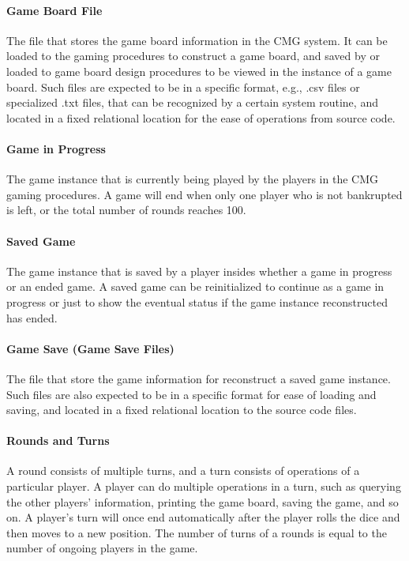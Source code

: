 \documentclass{article}
\begin{document}
\paragraph{Game Board File} The file that stores the game board information in the CMG system. It can be loaded to the gaming procedures to construct a game board, and saved by or loaded to game board design procedures to be viewed in the instance of a game board.
Such files are expected to be in a specific format, e.g., .csv files or specialized .txt files, that can be recognized by a certain system routine, and located in a fixed relational location
for the ease of operations from source code.

\paragraph{Game in Progress} The game instance that is currently being played by the players in the CMG gaming procedures. A game will end when only one player who is not bankrupted is left, or the total number of rounds reaches 100.

\paragraph{Saved Game} The game instance that is saved by a player insides whether a game in progress or an ended game. 
A saved game can be reinitialized to continue as a game in progress or just to show the eventual status if the game instance reconstructed has ended.

\paragraph{Game Save (Game Save Files)} The file that store the game information for reconstruct a saved game instance. 
Such files are also expected to be in a specific format for ease of loading and saving, and located in a fixed relational location to the source code files.

\paragraph{Rounds and Turns} A round consists of multiple turns, and a turn consists of operations of a particular player.
A player can do multiple operations in a turn, such as querying the other players' information, printing the game board, saving the game, and so on.
A player's turn will once end automatically after the player rolls the dice and then moves to a new position.
The number of turns of a rounds is equal to the number of ongoing players in the game.
\end{document}
